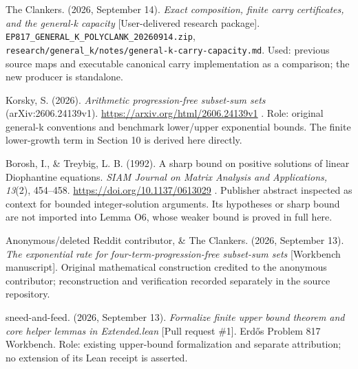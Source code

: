 The Clankers. (2026, September 14). \emph{Exact composition, finite carry certificates, and the general-k capacity} {[}User-delivered research package{]}. \nolinkurl{EP817_GENERAL_K_POLYCLANK_20260914.zip}, \nolinkurl{research/general_k/notes/general-k-carry-capacity.md}. Used: previous source maps and executable canonical carry implementation as a comparison; the new producer is standalone.

Korsky, S. (2026). \emph{Arithmetic progression-free subset-sum sets} (arXiv:2606.24139v1). \url{https://arxiv.org/html/2606.24139v1} . Role: original general-k conventions and benchmark lower/upper exponential bounds. The finite lower-growth term in Section 10 is derived here directly.

Borosh, I., \& Treybig, L. B. (1992). A sharp bound on positive solutions of linear Diophantine equations. \emph{SIAM Journal on Matrix Analysis and Applications, 13}(2), 454--458. \url{https://doi.org/10.1137/0613029} . Publisher abstract inspected as context for bounded integer-solution arguments. Its hypotheses or sharp bound are not imported into Lemma O6, whose weaker bound is proved in full here.

Anonymous/deleted Reddit contributor, \& The Clankers. (2026, September 13). \emph{The exponential rate for four-term-progression-free subset-sum sets} {[}Workbench manuscript{]}. Original mathematical construction credited to the anonymous contributor; reconstruction and verification recorded separately in the source repository.

sneed-and-feed. (2026, September 13). \emph{Formalize finite upper bound theorem and core helper lemmas in Extended.lean} {[}Pull request \#1{]}. Erdős Problem 817 Workbench. Role: existing upper-bound formalization and separate attribution; no extension of its Lean receipt is asserted.
